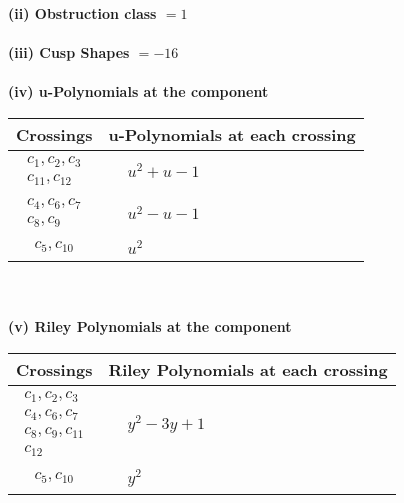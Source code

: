 \documentclass[1p]{elsarticle_modified}
\theoremstyle{definition}
\begin{document}
\flushleft \textbf{(ii) Obstruction class $= 1$}\\~\\
\flushleft \textbf{(iii) Cusp Shapes $= -16$}\\~\\
\newpage\renewcommand{\arraystretch}{1}
\flushleft \textbf{(iv) u-Polynomials at the component}\newline \\
\begin{tabular}{m{50pt}|m{274pt}}
Crossings & \hspace{64pt}u-Polynomials at each crossing \\
\hline $$\begin{aligned}c_{1},c_{2},c_{3}\\c_{11},c_{12}\end{aligned}$$&$\begin{aligned}
&u^2+u-1
\end{aligned}$\\
\hline $$\begin{aligned}c_{4},c_{6},c_{7}\\c_{8},c_{9}\end{aligned}$$&$\begin{aligned}
&u^2- u-1
\end{aligned}$\\
\hline $$\begin{aligned}c_{5},c_{10}\end{aligned}$$&$\begin{aligned}
&u^2
\end{aligned}$\\
\hline
\end{tabular}\\~\\
\newpage\renewcommand{\arraystretch}{1}
\flushleft \textbf{(v) Riley Polynomials at the component}\newline \\
\begin{tabular}{m{50pt}|m{274pt}}
Crossings & \hspace{64pt}Riley Polynomials at each crossing \\
\hline $$\begin{aligned}c_{1},c_{2},c_{3}\\c_{4},c_{6},c_{7}\\c_{8},c_{9},c_{11}\\c_{12}\end{aligned}$$&$\begin{aligned}
&y^2-3 y+1
\end{aligned}$\\
\hline $$\begin{aligned}c_{5},c_{10}\end{aligned}$$&$\begin{aligned}
&y^2
\end{aligned}$\\
\hline
\end{tabular}\\~\\
\end{document}
